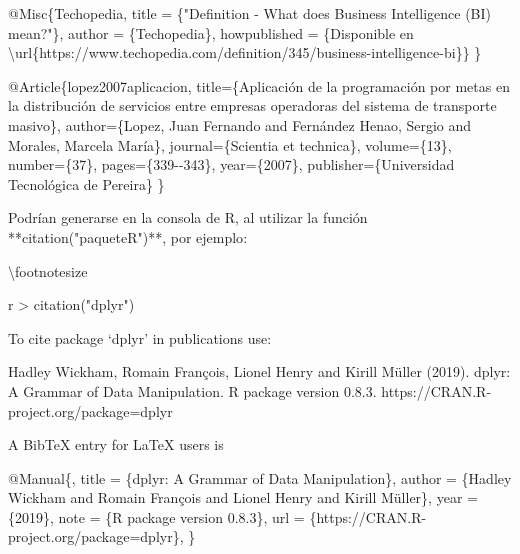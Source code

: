 \documentclass[11pt,a4paper,oneside,]{article}
\newenvironment{Shaded}{\begin{snugshade}}{\end{snugshade}}
\newcommand{\AttributeTok}[1]{\textcolor[rgb]{0.77,0.63,0.00}{#1}}
\newcommand{\NormalTok}[1]{#1}
\newcommand{\SpecialCharTok}[1]{\textcolor[rgb]{0.00,0.00,0.00}{#1}}
\newcommand{\StringTok}[1]{\textcolor[rgb]{0.31,0.60,0.02}{#1}}
\numberwithin{dummy}{section}
\theoremstyle{ocrenumbox}
\theoremstyle{blacknumex}
\theoremstyle{blacknumbox}
\theoremstyle{ocrenum}
\theoremstyle{ocrenum}
\begin{document}
\begin{Shaded}
\begin{Highlighting}[numbers=left,,firstnumber=1101,]
\AttributeTok{@Misc\{Techopedia,}
\AttributeTok{  title = \{"Definition {-} What does Business Intelligence (BI) mean?"\},}
\AttributeTok{  author = \{Techopedia\},}
\AttributeTok{  howpublished = \{Disponible en}
\AttributeTok{  \textbackslash{}url\{https://www.techopedia.com/definition/345/business{-}intelligence{-}bi\}\}}
\AttributeTok{\}}

\AttributeTok{@Article\{lopez2007aplicacion,}
\AttributeTok{  title=\{Aplicación de la programación por metas en la distribución de }
\AttributeTok{  servicios entre empresas operadoras del sistema de transporte masivo\},}
\AttributeTok{  author=\{Lopez, Juan Fernando and Fernández Henao, Sergio and Morales,}
\AttributeTok{  Marcela María\},}
\AttributeTok{  journal=\{Scientia et technica\},}
\AttributeTok{  volume=\{13\},}
\AttributeTok{  number=\{37\},}
\AttributeTok{  pages=\{339{-}{-}343\},}
\AttributeTok{  year=\{2007\},}
\AttributeTok{  publisher=\{Universidad Tecnológica de Pereira\}}
\AttributeTok{\}}

\StringTok{\textasciigrave{}\textasciigrave{}\textasciigrave{}}


\NormalTok{Podrían generarse en la consola de R, al utilizar la función }\SpecialCharTok{**}\StringTok{\textasciigrave{}}\AttributeTok{citation("paqueteR")}\StringTok{\textasciigrave{}}\SpecialCharTok{**}\NormalTok{, por ejemplo}\SpecialCharTok{:} 

\NormalTok{\textbackslash{}footnotesize}

\StringTok{\textasciigrave{}\textasciigrave{}\textasciigrave{}}\AttributeTok{r}
\AttributeTok{\textgreater{} citation("dplyr")}

\AttributeTok{To cite package ‘dplyr’ in publications use:}

\AttributeTok{  Hadley Wickham, Romain François, Lionel Henry and Kirill Müller (2019). dplyr: A}
\AttributeTok{  Grammar of Data Manipulation. R package version 0.8.3.}
\AttributeTok{  https://CRAN.R{-}project.org/package=dplyr}

\AttributeTok{A BibTeX entry for LaTeX users is}

\AttributeTok{  @Manual\{,}
\AttributeTok{    title = \{dplyr: A Grammar of Data Manipulation\},}
\AttributeTok{    author = \{Hadley Wickham and Romain François and Lionel Henry and Kirill Müller\},}
\AttributeTok{    year = \{2019\},}
\AttributeTok{    note = \{R package version 0.8.3\},}
\AttributeTok{    url = \{https://CRAN.R{-}project.org/package=dplyr\},}
\AttributeTok{  \}}

\StringTok{\textasciigrave{}\textasciigrave{}\textasciigrave{}}


\end{Highlighting}
\end{Shaded}
\end{document}
